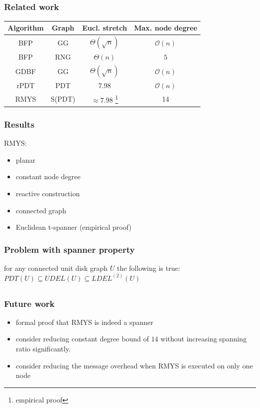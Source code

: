\documentclass[compress]{beamer}
\begin{document}
\subsection{}
\begin{frame}
\frametitle{Related work}
\begin{table}[h!]
\centering
\hspace*{-5mm}
\begin{tabular}{cccc}
\hline 
Algorithm & Graph & Eucl. stretch & Max. node degree \\ 
\hline
BFP & GG & $\Theta{(\sqrt{n})} $ & $\mathcal{O}(n) $ \\ 

BFP & RNG & $\Theta{(n)} $ & $ 5 $ \\

GDBF & GG & $\Theta{(\sqrt{n})} $ & $\mathcal{O}(n) $ \\ 

rPDT & PDT & $7.98 $ & $\mathcal{O}(n) $ \\ 

RMYS & S(PDT) & $\approx 7.98 $ \footnote{empirical proof} & 14 \\
\hline 
\end{tabular} 
\label{table:topologies}
\end{table}
\end{frame}

\begin{frame}
\frametitle{Results}
RMYS:
\begin{itemize}
\item planar
\item constant node degree
\item reactive construction
\item connected graph
\item Euclidean t-spanner (empirical proof)
\end{itemize}
\end{frame}


\begin{frame}
\frametitle{Problem with spanner property}
\center for any connected unit disk graph $U $ the following is true:
\center $PDT(U) \subseteq UDEL(U) \subseteq LDEL^{(2)}(U) $
\end{frame}

\subsection{}
\begin{frame}
\frametitle{Future work}
\begin{itemize}
\item formal proof that RMYS is indeed a spanner
\item consider reducing constant degree bound of $14 $ without increasing spanning ratio significantly.
\item consider reducing the message overhead when RMYS is executed on only one node
\end{itemize}
\end{frame}
\end{document}
